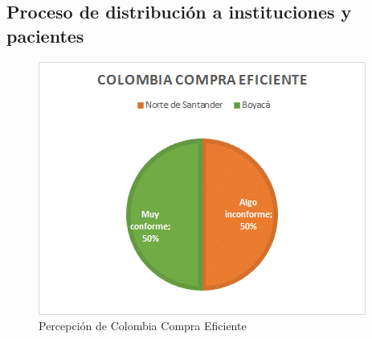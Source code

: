 \documentclass[
]{book}
\begin{document}
\hypertarget{proceso-de-distribuciuxf3n-a-instituciones-y-pacientes}{%
\subsection{Proceso de distribución a instituciones y pacientes}\label{proceso-de-distribuciuxf3n-a-instituciones-y-pacientes}}

\begin{figure}
\includegraphics[width=0.85\linewidth]{figures/Imagen7} \caption{Percepción de Colombia Compra Eficiente}\label{fig:ColombiaCompraEficienteRecRegAndinaNorte}
\end{figure}

\begingroup\fontsize{8}{10}\selectfont
\end{document}
